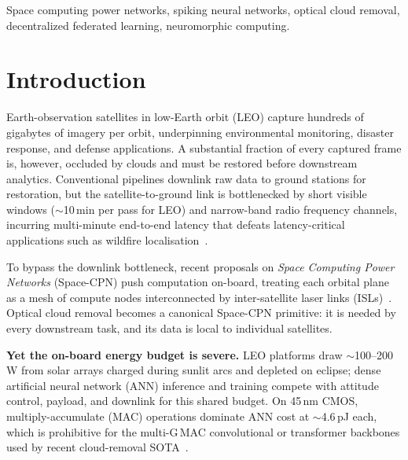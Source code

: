 \documentclass[conference]{IEEEtran}
\begin{document}
\begin{IEEEkeywords}
Space computing power networks, spiking neural networks, optical
cloud removal, decentralized federated learning, neuromorphic
computing.
\end{IEEEkeywords}


\section{Introduction}\label{sec:intro}

 Earth-observation satellites in low-Earth
orbit (LEO) capture hundreds of gigabytes of imagery per orbit,
underpinning environmental monitoring, disaster response, and
defense applications. A substantial fraction of every captured
frame is, however, occluded by clouds and must be restored before
downstream analytics. Conventional pipelines downlink raw data to
ground stations for restoration, but the satellite-to-ground link
is bottlenecked by short visible windows ($\sim$10\,min per pass for
LEO) and narrow-band radio frequency channels, incurring multi-minute
end-to-end latency that defeats latency-critical applications such
as wildfire localisation~\cite{ref:earthobs1,ref:earthobs2}.

To bypass the downlink bottleneck, recent proposals on
\emph{Space Computing Power Networks} (Space-CPN) push computation
on-board, treating each orbital plane as a mesh of compute nodes
interconnected by inter-satellite laser links
(ISLs)~\cite{ref:spacecpn1,ref:spacecpn2}. Optical cloud removal
becomes a canonical Space-CPN primitive: it is needed by every
downstream task, and its data is local to individual satellites.

\textbf{Yet the on-board energy budget is severe.} LEO platforms
draw $\sim$100--200\,W from solar arrays charged during sunlit arcs
and depleted on eclipse; dense artificial neural network (ANN)
inference and training compete with attitude control, payload, and
downlink for this shared budget. On 45\,nm CMOS, multiply-accumulate
(MAC) operations dominate ANN cost at $\sim$4.6\,pJ each, which is
prohibitive for the multi-G\,MAC convolutional or transformer
backbones used by recent cloud-removal SOTA~\cite{ref:cuhkcr,
ref:darkir}.
\end{document}
